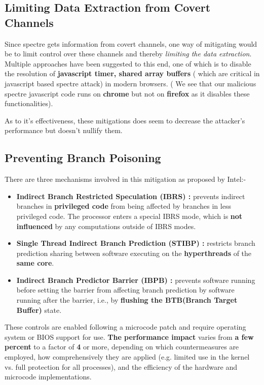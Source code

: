 \documentclass[12pt]{article}
\begin{document}
\subsection{Limiting Data Extraction from Covert Channels}
Since spectre gets information from covert channels, one way of mitigating would be to limit control over these channels and thereby \textit{limiting the data extraction}. Multiple approaches have been suggested to this end, one of which is to disable the resolution of \textbf{javascript timer, shared array buffers} ( which are critical in javascript based spectre attack) in modern browsers. ( We see that our malicious spectre javascript code runs on \textbf{chrome} but not on \textbf{firefox} as it disables these functionalities).

As to it's effectiveness, these mitigations does seem to decrease the attacker's performance but doesn't nullify them.
\subsection{Preventing Branch Poisoning}
There are three mechanisms involved in this mitigation as proposed by Intel\cite{Intel_mitigation}:- 
\begin{itemize}
	\item \textbf{Indirect Branch Restricted Speculation (IBRS) : } prevents indirect branches in \textbf{privileged code} from being affected by branches in less privileged code. The processor enters a special IBRS mode, which is \textbf{not influenced} by any computations outside of IBRS modes.
	\item \textbf{Single Thread Indirect Branch Prediction (STIBP) : } restricts branch prediction sharing between software executing on the \textbf{hyperthreads} of the \textbf{same core}.
	\item \textbf{Indirect Branch Predictor Barrier (IBPB) : } prevents software running before setting the barrier from affecting branch prediction by software running after the barrier, i.e., by \textbf{flushing the BTB(Branch Target Buffer)} state.
\end{itemize}
These controls are enabled following a microcode patch and require operating system or BIOS support for use. \textbf{The performance impact} varies from \textbf{a few percent} to a factor of \textbf{4} or more, depending on which countermeasures are employed, how comprehensively they are applied (e.g. limited use in the kernel vs. full protection for all processes), and the efficiency of the hardware and microcode implementations.
\newpage
\end{document}
